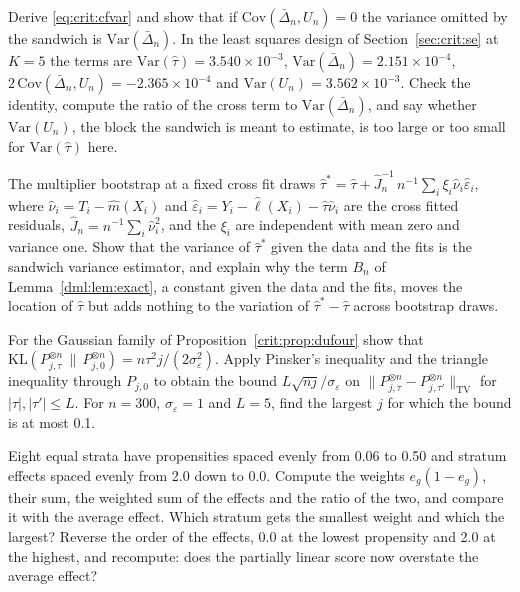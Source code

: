 \begin{exercises}
\item\label{ex:chcrit:7} Derive \eqref{eq:crit:cfvar} and show that if $\mathrm{Cov}(\bar\Delta_n, U_n) = 0$ the variance omitted by the sandwich is $\mathrm{Var}(\bar\Delta_n)$. In the least squares design of Section~\ref{sec:crit:se} at $K = 5$ the terms are $\mathrm{Var}(\hat\tau) = 3.540\times 10^{-3}$, $\mathrm{Var}(\bar\Delta_n) = 2.151\times 10^{-4}$, $2\,\mathrm{Cov}(\bar\Delta_n, U_n) = -2.365\times 10^{-4}$ and $\mathrm{Var}(U_n) = 3.562\times 10^{-3}$. Check the identity, compute the ratio of the cross term to $\mathrm{Var}(\bar\Delta_n)$, and say whether $\mathrm{Var}(U_n)$, the block the sandwich is meant to estimate, is too large or too small for $\mathrm{Var}(\hat\tau)$ here.
\item\label{ex:chcrit:8} The multiplier bootstrap at a fixed cross fit draws $\hat\tau^* = \hat\tau + \hat J_n^{-1}\,n^{-1}\sum_i \xi_i\hat\nu_i\hat\varepsilon_i$, where $\hat\nu_i = T_i - \hat m(X_i)$ and $\hat\varepsilon_i = Y_i - \hat\ell(X_i) - \hat\tau\hat\nu_i$ are the cross fitted residuals, $\hat J_n = n^{-1}\sum_i\hat\nu_i^2$, and the $\xi_i$ are independent with mean zero and variance one. Show that the variance of $\hat\tau^*$ given the data and the fits is the sandwich variance estimator, and explain why the term $B_n$ of Lemma~\ref{dml:lem:exact}, a constant given the data and the fits, moves the location of $\hat\tau$ but adds nothing to the variation of $\hat\tau^* - \hat\tau$ across bootstrap draws.
\item\label{ex:chcrit:9} For the Gaussian family of Proposition~\ref{crit:prop:dufour} show that $\mathrm{KL}(P_{j,\tau}^{\otimes n}\,\|\,P_{j,0}^{\otimes n}) = n\tau^2 j/(2\sigma_\varepsilon^2)$. Apply Pinsker's inequality and the triangle inequality through $P_{j,0}$ to obtain the bound $L\sqrt{nj}/\sigma_\varepsilon$ on $\|P_{j,\tau}^{\otimes n} - P_{j,\tau'}^{\otimes n}\|_{\mathrm{TV}}$ for $|\tau|, |\tau'| \le L$. For $n = 300$, $\sigma_\varepsilon = 1$ and $L = 5$, find the largest $j$ for which the bound is at most 0.1.
\item\label{ex:chcrit:10} Eight equal strata have propensities spaced evenly from 0.06 to 0.50 and stratum effects spaced evenly from 2.0 down to 0.0. Compute the weights $e_g(1 - e_g)$, their sum, the weighted sum of the effects and the ratio of the two, and compare it with the average effect. Which stratum gets the smallest weight and which the largest? Reverse the order of the effects, 0.0 at the lowest propensity and 2.0 at the highest, and recompute: does the partially linear score now overstate the average effect?
\end{exercises}
